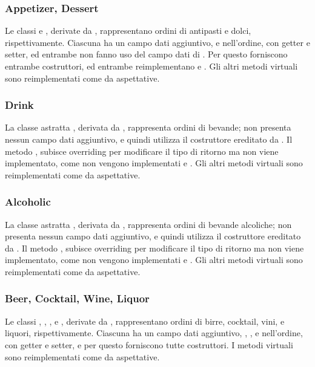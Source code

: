 \subsubsection{Appetizer, Dessert} %
\label{ssub:appetizer_e_dessert}
Le classi  e , derivate da , rappresentano ordini di antipasti e dolci, rispettivamente. Ciascuna ha un campo dati aggiuntivo,  e  nell'ordine, con getter e setter, ed entrambe non fanno uso del campo dati  di . Per questo forniscono entrambe costruttori, ed entrambe reimplementano  e . Gli altri metodi virtuali sono reimplementati come da aspettative.
\subsubsection{Drink} %
\label{ssub:drink}
La classe astratta , derivata da , rappresenta ordini di bevande; non presenta nessun campo dati aggiuntivo, e quindi utilizza il costruttore ereditato da . Il metodo , subisce overriding per modificare il tipo di ritorno ma non viene implementato, come non vengono implementati  e . Gli altri metodi virtuali sono reimplementati come da aspettative.
\subsubsection{Alcoholic} %
\label{ssub:alcoholic}
La classe astratta , derivata da , rappresenta ordini di bevande alcoliche; non presenta nessun campo dati aggiuntivo, e quindi utilizza il costruttore ereditato da . Il metodo , subisce overriding per modificare il tipo di ritorno ma non viene implementato, come non vengono implementati  e . Gli altri metodi virtuali sono reimplementati come da aspettative.
\subsubsection{Beer, Cocktail, Wine, Liquor} %
\label{ssub:beer_cocktail_wine_liquor}
Le classi , , , e , derivate da , rappresentano ordini di birre, cocktail, vini, e liquori, rispettivamente. Ciascuna ha un campo dati aggiuntivo, , ,  e  nell'ordine, con getter e setter, e per questo forniscono tutte costruttori. I metodi virtuali sono reimplementati come da aspettative.
